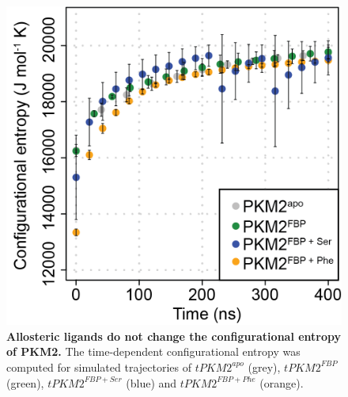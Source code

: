 \begin{figure}[!ht]
\includegraphics[scale=0.8]{ch6_fig8_entropy.png}
\caption[Allosteric ligands do not change the configurational entropy of PKM2.]{\textbf{Allosteric ligands do not change the configurational entropy of PKM2.} The time-dependent configurational entropy was computed for simulated trajectories of $tPKM2^{apo}$ (grey), $tPKM2^{FBP}$ (green), $tPKM2^{FBP+Ser}$ (blue) and $tPKM2^{FBP+Phe}$ (orange).}
\label{fig:entropy}
\end{figure}
%
%
\clearpage



